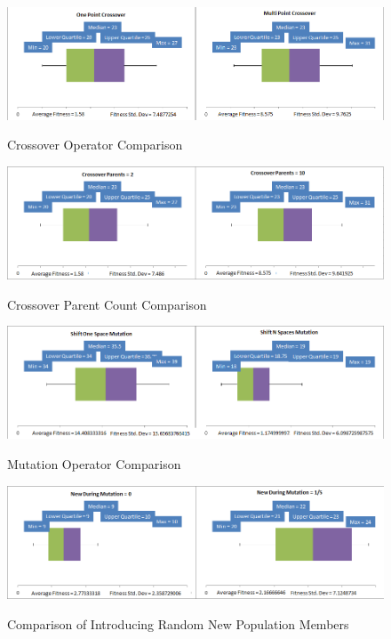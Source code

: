 \documentclass[]{report}
\begin{document}
\begin{figure}
	\centering
	\includegraphics[width=\textwidth]{figures/boxplots/crossoverOperator.png}
	\label{BPcrossoverOperator}
	\caption{Crossover Operator Comparison}
\end{figure}

\begin{figure}
	\centering
	\includegraphics[width=\textwidth]{figures/boxplots/crossoverParentCount.png}
	\label{BPcrossoverParentCount}
	\caption{Crossover Parent Count Comparison}
\end{figure}

\begin{figure}
	\centering
	\includegraphics[width=\textwidth]{figures/boxplots/mutationOperator.png}
	\label{BPmutationOperator}
	\caption{Mutation Operator Comparison}
\end{figure}

\begin{figure}
	\centering
	\includegraphics[width=\textwidth]{figures/boxplots/newDuringMutation.png}
	\label{BPnewDuringMutation}
	\caption{Comparison of Introducing Random New Population Members}
\end{figure}
\end{document}
